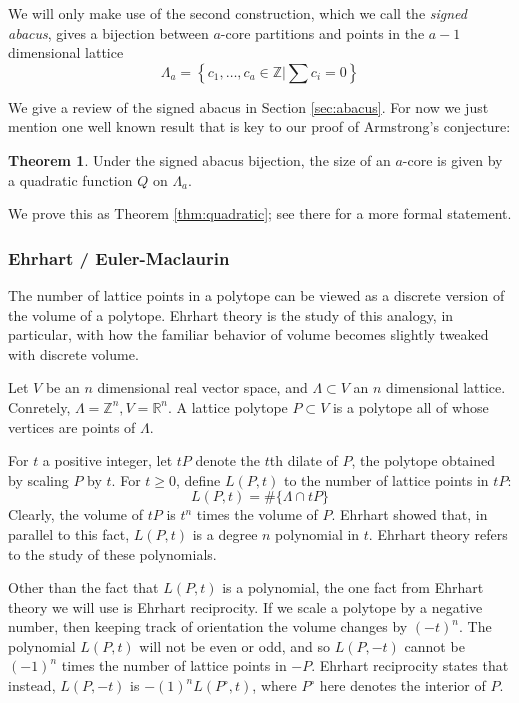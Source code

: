 \documentclass{amsart}[12pt]
\theoremstyle{definition}
\newtheorem{theorem}[dummy]{Theorem}
\newcommand{\Z}{\mathbb{Z}}
\newcommand{\R}{\mathbb{R}}
\begin{document}
We will only make use of the second construction, which we call the \emph{signed abacus}, gives a bijection between $a$-core partitions and points in the $a-1$ dimensional lattice 
$$\Lambda_a=\left\{c_1,\dots,c_a\in\Z\Big |\sum c_i=0\right\}$$

We give a review of the signed abacus in Section \ref{sec:abacus}.  For now we just mention one well known result that is key to our proof of Armstrong's conjecture: 
\begin{theorem}
Under the signed abacus bijection, the size of an $a$-core is given by a quadratic function $Q$ on $\Lambda_a$.
\end{theorem}
We prove this as Theorem \ref{thm:quadratic}; see there for a more formal statement.



\subsubsection{Ehrhart / Euler-Maclaurin}
The number of lattice points in a polytope can be viewed as a discrete version of the volume of a polytope.  Ehrhart theory is the study of this analogy, in particular, with how the familiar behavior of volume becomes slightly tweaked with discrete volume.

Let $V$ be an $n$ dimensional real vector space, and $\Lambda\subset V$ an $n$ dimensional lattice.  Conretely, $\Lambda=\Z^n, V=\R^n$.  A lattice polytope $P\subset V$ is a polytope all of whose vertices are points of $\Lambda$.  

For $t$ a positive integer, let $tP$ denote the $t$th dilate of $P$, the polytope obtained by scaling $P$ by $t$.  For $t\geq 0$, define $L(P,t)$ to the number of lattice points in $tP$: 
$$L(P,t)=\#\{\Lambda\cap tP\}$$
Clearly, the volume of $tP$ is $t^n$ times the volume of $P$.  Ehrhart showed that, in parallel to this fact, $L(P,t)$ is a degree $n$ polynomial in $t$.  Ehrhart theory refers to the study of these polynomials.

Other than the fact that $L(P,t)$ is a polynomial, the one fact from Ehrhart theory we will use is Ehrhart reciprocity.  If we scale a polytope by a negative number, then keeping track of orientation the volume changes by $(-t)^n$.  The polynomial $L(P,t)$ will not be even or odd, and so $L(P,-t)$ cannot be $(-1)^n$ times the number of lattice points in $-P$.  Ehrhart reciprocity states that instead, $L(P,-t)$ is $-(1)^nL(P^\circ, t)$, where $P^\circ$ here denotes the interior of $P$.
\end{document}
